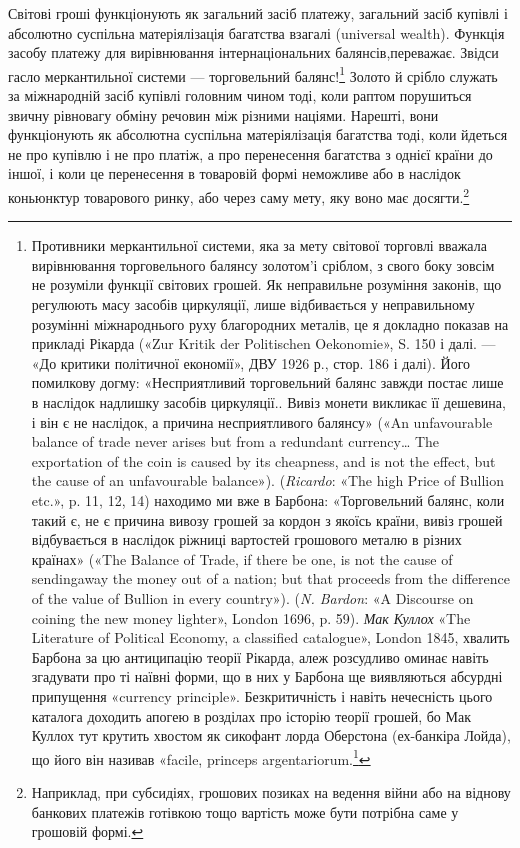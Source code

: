 Світові гроші функціонують як загальний засіб платежу,
загальний засіб купівлі і абсолютно суспільна матеріялізація
багатства взагалі (universal wealth). Функція засобу платежу
для вирівнювання інтернаціональних балянсів,переважає. Звідси
гасло меркантильної системи — торговельний балянс!\footnote{
Противники меркантильної системи, яка за мету світової торговлі
вважала вирівнювання торговельного балянсу золотом'і сріблом, з свого
боку зовсім не розуміли функції світових грошей. Як неправильне розуміння
законів, що регулюють масу засобів циркуляції, лише відбивається
у неправильному розумінні міжнароднього руху благородних металів,
це я докладно показав на прикладі Рікарда («Zur Kritik der Politischen
Oekonomie», S. 150 і далі. — «До критики політичної економії», ДВУ
1926 р., стор. 186 і далі). Його помилкову догму: «Несприятливий торговельний
балянс завжди постає лише в наслідок надлишку засобів циркуляції..
Вивіз монети викликає її дешевина, і він є не наслідок, а причина
несприятливого балянсу» («An unfavourable balance of trade never
arises but from a redundant currency\dots{} The exportation of the coin is caused
by its cheapness, and is not the effect, but the cause of an unfavourable
balance»). (\emph{Ricardo}: «The high Price of Bullion etc.», p. 11, 12, 14)
находимо ми вже в Барбона: «Торговельний балянс, коли такий є, не
є причина вивозу грошей за кордон з якоїсь країни, вивіз грошей відбувається
в наслідок ріжниці вартостей грошового металю в різних країнах»
(«The Balance of Trade, if there be one, is not the cause of sendingaway
the money out of a nation; but that proceeds from the difference of the value
of Bullion in every country»). (\emph{N. Bardon}: «A Discourse on coining
the new money lighter», London 1696, p. 59). \emph{Мак Куллох} «The Literature
of Political Economy, a classified catalogue», London 1845, хвалить
Барбона за цю антиципацію теорії Рікарда, алеж розсудливо оминає
навіть згадувати про ті наївні форми, що в них у Барбона ще виявляються
абсурдні припущення «currency principle». Безкритичність і навіть нечесність
цього каталога доходить апогею в розділах про історію теорії
грошей, бо Мак Куллох тут крутить хвостом як сикофант лорда Оберстона
(ех-банкіра Лойда), що його він називав «facile, princeps argentariorum.\footnote*{
— безперечним головою банкірів. \emph{Ред.}
}
} Золото й срібло служать за міжнародній засіб купівлі головним чином
тоді, коли раптом порушиться звичну рівновагу обміну речовин
між різними націями. Нарешті, вони функціонують як абсолютна
суспільна матеріялізація багатства тоді, коли йдеться не
про купівлю і не про платіж, а про перенесення багатства з однієї
країни до іншої, і коли це перенесення в товаровій формі неможливе
або в наслідок коньюнктур товарового ринку, або через
саму мету, яку воно має досягти.\footnote{
Наприклад, при субсидіях, грошових позиках на ведення війни
або на віднову банкових платежів готівкою тощо вартість може бути потрібна
саме у грошовій формі.
}

